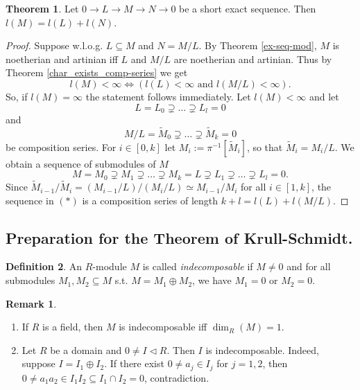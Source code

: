 \documentclass[12pt,a4paper]{report}
\theoremstyle{definition}
\newtheorem{theorem}{Theorem}[chapter] %
\newtheorem{defn}[theorem]{Definition}
\newtheorem*{remark}{Remark}
\theoremstyle{num.custom-title}
\DeclareMathOperator{\sse}{\subseteq}
\newcommand{\IFF}{\Longleftrightarrow}
\begin{document}
\begin{theorem}\label{thm_length_sh-ex-seq}
Let $0 \to L \to M \to N \to 0$ be a short exact sequence. Then $l(M)=l(L)+l(N)$.
\begin{proof}
Suppose w.l.o.g. $L \sse M$ and $N=M/L$. By Theorem \ref{ex-seq-mod}, $M$ is noetherian and artinian iff $L$ and $M/L$ are noetherian and artinian. Thus by Theorem \ref{char_exists_comp-series} we get
\[
l(M) < \infty \IFF ( l(L) < \infty \text{ and } l(M/L) < \infty ).
\]
So, if $l(M)=\infty$ the statement follows immediately. Let $l(M)<\infty$ and let
\[
L=L_0 \supsetneq \ldots \supsetneq L_l =0
\]
and
\[
M/L = \tilde{M}_0 \supsetneq \ldots \supsetneq \tilde{M}_k = 0
\]
be composition series. For $i \in [0,k]$ let $M_i := \pi^{-1}[\tilde{M}_i]$, so that $\tilde{M}_i = M_i/L$. We obtain a sequence of submodules of $M$
\[
M=M_0 \supsetneq M_1 \supsetneq \ldots \supsetneq M_k = L \supsetneq L_1 \supsetneq \ldots \supsetneq L_l=0. \tag{$*$}
\]
Since $\tilde{M}_{i-1}/\tilde{M}_i = (M_{i-1}/L)/(M_i/L) \simeq M_{i-1}/M_i$ for all $i \in [1,k]$, the sequence in $(*)$ is a composition series of length $k+l = l(L)+l(M/L)$.
\end{proof}
\end{theorem}

\subsection{Preparation for the Theorem of Krull-Schmidt.}

\begin{defn}
An $R$-module $M$ is called \emph{indecomposable} if $M \neq 0$ and for all submodules $M_1,M_2 \sse M$ s.t. $M = M_1 \oplus M_2$, we have $M_1=0$ or $M_2=0$.
\end{defn}

\begin{remark}\ 
\begin{enumerate}
\item If $R$ is a field, then $M$ is indecomposable iff $\dim_R(M)=1$.
\item Let $R$ be a domain and $0 \neq I \lhd R$. Then $I$ is indecomposable. Indeed, suppose $I=I_1 \oplus I_2$. If there exist $0 \neq a_j \in I_j$ for $j=1,2$, then $0 \neq a_1 a_2 \in I_1 I_2 \sse I_1 \cap I_2 = 0$, contradiction.
\end{enumerate}
\end{remark}
\end{document}
